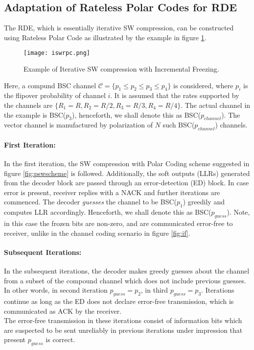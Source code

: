 \documentclass[
11pt, %
a4paper, %
oneside, %
headinclude,footinclude, %
BCOR5mm, %
]{scrartcl}
\begin{document}
\subsection{Adaptation of Rateless Polar Codes for RDE}\label{adapt}
The RDE, which is essentially iterative SW compression, can be constructed using Rateless Polar Code as illustrated by the example in figure \ref{fig:iswrpc}.
\begin{figure}[h]
 \begin{center}
    \texttt{[image: iswrpc.png]}
  \end{center}
  \caption{Example of Iterative SW compression with Incremental Freezing.}
  \label{fig:iswrpc}
\end{figure} 
Here, a compund BSC channel $\mathcal{C}=\{ p_1 \leq p_2 \leq p_3 \leq p_4\}$ is considered, where $p_i$ is the flipover probability of channel $i$. It is assumed that the rates supported by the channels are $\{ R_1=R, R_2= R/2,R_3= R/3,R_4= R/4\}$. The actual channel in the example is BSC($p_3$), henceforth, we shall denote this as BSC($p_{channel}$). The vector channel is manufactured by polarization of $N$ such BSC($p_{channel}$) channels.
\paragraph{First Iteration:} In the first iteration, the SW compression with Polar Coding scheme suggested in figure \ref{fig:pswscheme} is followed. Additionally, the soft outputs (LLRs) generated from the decoder block are passed through an error-detection (ED) block. In case error is present, receiver replies with a NACK and further iterations are commenced. The decoder \emph{guesses} the channel to be BSC($p_1$) greedily and computes LLR accordingly. Henceforth, we shall denote this as BSC($p_{guess}$). Note, in this case the frozen bits are non-zero, and are communicated error-free to receiver, unlike in the channel coding scenario in figure \ref{fig:if}.
\paragraph{Subsequent Iterations:}In the subsequent iterations, the decoder makes greedy guesses about the channel from a subset of the compound channel which does not include previous guesses. In other words, in second iteration $p_{guess}=p_2$, in third $p_{guess}=p_3$. Iterations continue as long as the ED does not declare error-free transmission, which is communicated as ACK by the receiver.\\
The error-free transmission in these iterations consist of information bits which are suspected to be sent unreliably in previous iterations under impression that present $p_{guess}$ is correct. 
\end{document}
